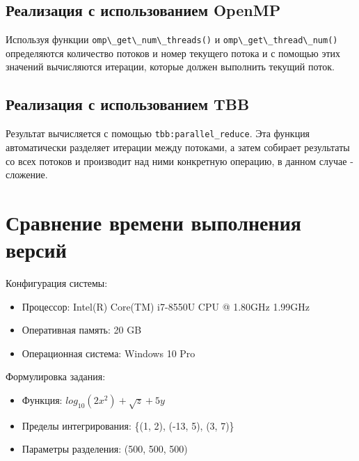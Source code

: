 \documentclass{report}
\begin{document}
    \subsection*{Реализация с использованием OpenMP}
    \par Используя функции \verb|omp\_get\_num\_threads()| и \verb|omp\_get\_thread\_num()| определяются количество потоков и номер текущего потока и с помощью этих значений вычисляются итерации, которые должен выполнить текущий поток.
    
    \subsection*{Реализация с использованием TBB}
    \par Результат вычисляется с помощью \verb|tbb:parallel_reduce|. Эта функция автоматически разделяет итерации между потоками, а затем собирает результаты со всех потоков и производит над ними конкретную операцию, в данном случае - сложение.
    \newpage
    
    \section*{Сравнение времени выполнения версий}
    \par Конфигурация системы:
    \begin{itemize}
        \item Процессор: Intel(R) Core(TM) i7-8550U CPU @ 1.80GHz 1.99GHz
        \item Оперативная память: 20 GB
        \item Операционная система: Windows 10 Pro
    \end{itemize}
    
    \par Формулировка задания:
    \begin{itemize}
        \item Функция: $log_{10}(2x^2) + \sqrt{z} + 5y$
        \item Пределы интегрирования: \{(1, 2), (-13, 5), (3, 7)\}
        \item Параметры разделения: (500, 500, 500)
    \end{itemize}
    
\end{document}

